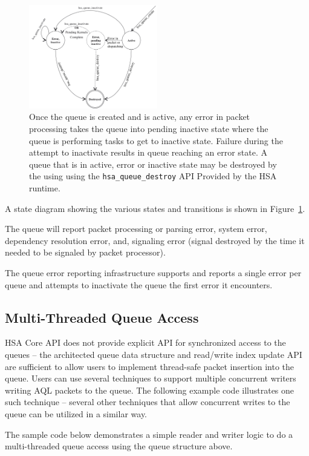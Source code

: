 \begin{figure}
  \centering
  \includegraphics[width=0.5\textwidth] {queuestate}
  \centering
  \caption{Once the queue is created and is active, any error in
          packet processing takes the queue into pending inactive
          state where the queue is performing tasks to get to
          inactive state. Failure during the attempt to inactivate
          results in queue reaching an error state. A queue that is
          in active, error or inactive state may be destroyed by the
          using using the \texttt{hsa\_queue\_destroy} API Provided by
  the HSA runtime.}
  \label{fig:queuestate}
\end{figure}

A state diagram showing the various states and transitions is shown
in Figure~\ref{fig:queuestate}.

The queue will report packet processing or parsing error, system
error, dependency resolution error, and, signaling error (signal
destroyed by the time it needed to be signaled by packet processor).

The queue error reporting infrastructure supports and reports a
single error per queue and attempts to inactivate the queue the
first error it encounters.

\hypertarget{coreapi_multithreading}{}\subsection{Multi-\/\-Threaded
Queue Access}\label{coreapi_multithreading}
H\-S\-A Core API does not provide explicit API for synchronized
access to the queues -- the architected queue data structure and
read/write index update API are
sufficient to allow users to implement thread-safe packet insertion
into the queue. Users can use several techniques to support
multiple concurrent writers writing AQL packets to the queue.  The
following example code illustrates one such technique -- several
other techniques that allow concurrent writes to the queue can be
utilized in a similar way.

The sample code below demonstrates a simple reader and writer logic
to do a multi-threaded queue access using the queue structure above.

\begin{framed}

\end{framed}

